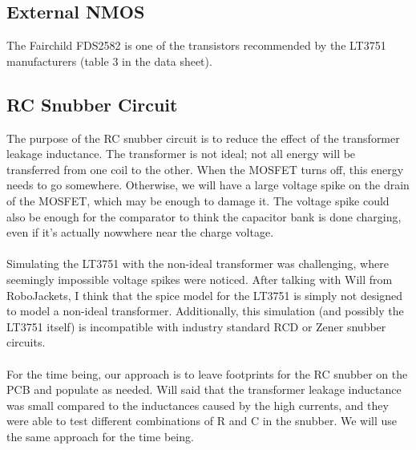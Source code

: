 \documentclass{article}
\begin{document}
	\subsection{External NMOS}
	The Fairchild FDS2582 is one of the transistors recommended by the LT3751 manufacturers (table 3 in the data sheet).
	\subsection{RC Snubber Circuit}
	The purpose of the RC snubber circuit is to reduce the effect of the transformer leakage inductance. The transformer is not ideal; not all energy will be transferred from one coil to the other. When the MOSFET turns off, this energy needs to go somewhere. Otherwise, we will have a large voltage spike on the drain of the MOSFET, which may be enough to damage it. The voltage spike could also be enough for the comparator to think the capacitor bank is done charging, even if it's actually nowwhere near the charge voltage.\\\\
	Simulating the LT3751 with the non-ideal transformer was challenging, where seemingly impossible voltage spikes were noticed. After talking with Will from RoboJackets, I think that the spice model for the LT3751 is simply not designed to model a non-ideal transformer. Additionally, this simulation (and possibly the LT3751 itself) is incompatible with industry standard RCD or Zener snubber circuits.\\\\ 
	For the time being, our approach is to leave footprints for the RC snubber on the PCB and populate as needed. Will said that the transformer leakage inductance was small compared to the inductances caused by the high currents, and they were able to test different combinations of R and C in the snubber. We will use the same approach for the time being. 
\end{document}
